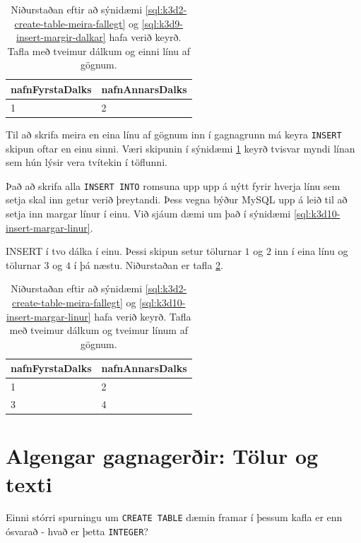 \begin{table}
\centering
\caption[Eftir INSERT á línu]{Niðurstaðan eftir að sýnidæmi \ref{sql:k3d2-create-table-meira-fallegt} og \ref{sql:k3d9-insert-margir-dalkar} hafa verið keyrð. Tafla með tveimur dálkum og einni línu af gögnum.}
\label{tafla:insert-margir-dalkar}
\begin{tabular}{ll}
\toprule
nafnFyrstaDalks&nafnAnnarsDalks\\
\midrule
1&2\\
\bottomrule
\end{tabular}
\end{table}
Til að skrifa meira en eina línu af gögnum inn í gagnagrunn má keyra \verb|INSERT| skipun oftar en einu sinni. Væri skipunin í sýnidæmi \ref{tafla:insert-margir-dalkar} keyrð tvisvar myndi línan sem hún lýsir vera tvítekin í töflunni.

Það að skrifa alla \verb|INSERT INTO| romsuna upp upp á nýtt fyrir hverja línu sem setja skal inn getur verið þreytandi. Þess vegna býður MySQL upp á leið til að setja inn margar línur í einu. Við sjáum dæmi um það í sýnidæmi \ref{sql:k3d10-insert-margar-linur}.

\begin{example}
\caption[INSERT í tvo dálka í einu]{INSERT í tvo dálka í einu. Þessi skipun setur tölurnar $1$ og $2$ inn í eina línu og tölurnar $3$ og $4$ í þá næstu. Niðurstaðan er tafla \ref{tafla:insert-margar-linur}.}
\label{sql:k3d10-insert-margar-linur}
\centering
{}
\end{example}

\begin{table}
\centering
\caption[Eftir INSERT á tveimur línum]{Niðurstaðan eftir að sýnidæmi \ref{sql:k3d2-create-table-meira-fallegt} og \ref{sql:k3d10-insert-margar-linur} hafa verið keyrð. Tafla með tveimur dálkum og tveimur línum af gögnum.}
\label{tafla:insert-margar-linur}
\begin{tabular}{ll}
\toprule
nafnFyrstaDalks&nafnAnnarsDalks\\
\midrule
1&2\\
3&4\\
\bottomrule
\end{tabular}
\end{table}

\section{Algengar gagnagerðir: Tölur og texti} %
\label{undirkafli:gagnagerdir}
Einni stórri spurningu um \verb|CREATE TABLE| dæmin framar í þessum kafla er enn ósvarað - hvað er þetta \verb|INTEGER|?

